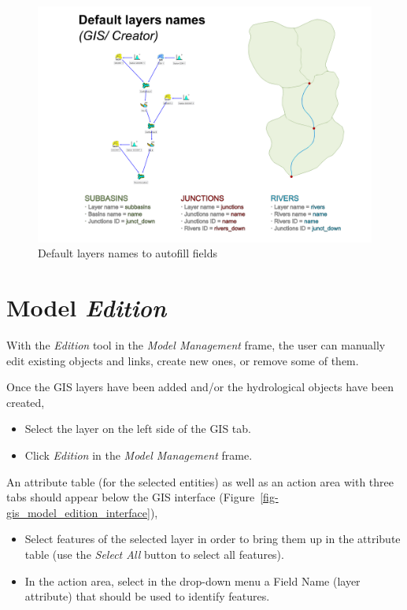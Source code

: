 \documentclass[
  letterpaper,
  DIV=11,
  numbers=noendperiod]{scrreprt}
\begin{document}
\begin{figure}

{\centering \includegraphics{./figures/fig-gis_default_layers_names.png}

}

\caption{\label{fig-gis_default_layers_names}Default layers names to
autofill fields}

\end{figure}

\hypertarget{model-edition}{%
\chapter{\texorpdfstring{Model
\emph{Edition}}{Model Edition}}\label{model-edition}}

With the \emph{Edition} tool in the \emph{Model Management} frame, the
user can manually edit existing objects and links, create new ones, or
remove some of them.

Once the GIS layers have been added and/or the hydrological objects have
been created,

\begin{itemize}
\item
  {Select the layer on the left side of the GIS tab.}
\item
  {Click \emph{Edition} in the \emph{Model Management} frame.}
\end{itemize}

An attribute table (for the selected entities) as well as an action area
with three tabs should appear below the GIS interface
(Figure~\ref{fig-gis_model_edition_interface}),

\begin{itemize}
\item
  {Select features of the selected layer in order to bring them up in
  the attribute table (use the \emph{Select All} button to select all
  features).}
\item
  {In the action area, select in the drop-down menu a Field Name (layer
  attribute) that should be used to identify features.}
\end{itemize}
\end{document}
